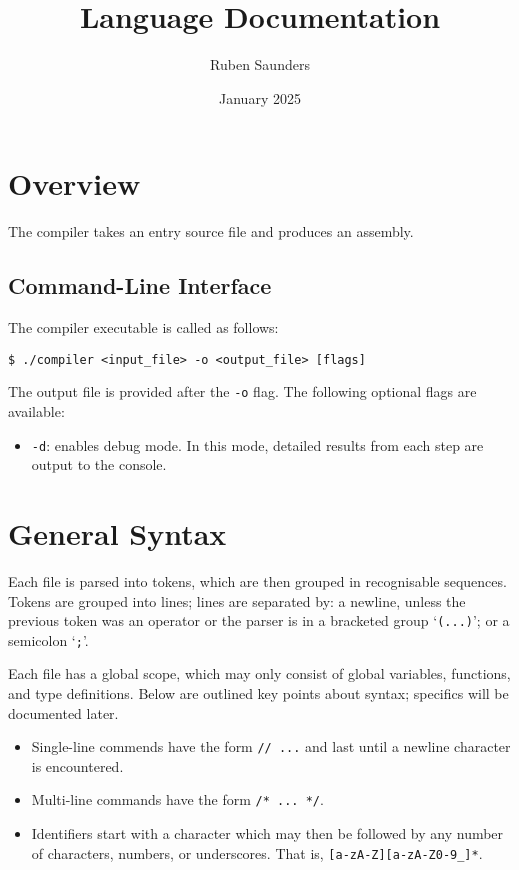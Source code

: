 \documentclass{article}
\title{Language Documentation}
\author{Ruben Saunders}
\date{January 2025}
\begin{document}
\maketitle
\tableofcontents

\newpage

\section{Overview}

The compiler takes an entry source file and produces an assembly.

\subsection{Command-Line Interface}

The compiler executable is called as follows:

\medskip
\begin{lstlisting}[style=bashconsole]
$ ./compiler <input_file> -o <output_file> [flags]
\end{lstlisting}

The output file is provided after the \texttt{-o} flag.
The following optional flags are available:
\begin{itemize}
    \item \texttt{-d}: enables debug mode.
    In this mode, detailed results from each step are output to the console.
\end{itemize}

\section{General Syntax}

Each file is parsed into tokens, which are then grouped in recognisable sequences.
Tokens are grouped into lines; lines are separated by: a newline, unless the previous token was an operator or the parser is in a bracketed group `\texttt{(...)}';
or a semicolon `\texttt{;}'.

Each file has a global scope, which may only consist of global variables, functions, and type definitions.
Below are outlined key points about syntax; specifics will be documented later.

\begin{itemize}
    \item Single-line commends have the form \texttt{// ...} and last until a newline character is encountered.
    \item Multi-line commands have the form \texttt{/* ... */}.
    \item Identifiers start with a character which may then be followed by any number of characters, numbers, or underscores.
    That is, \texttt{[a-zA-Z][a-zA-Z0-9\_]*}.
\end{itemize}
\end{document}
